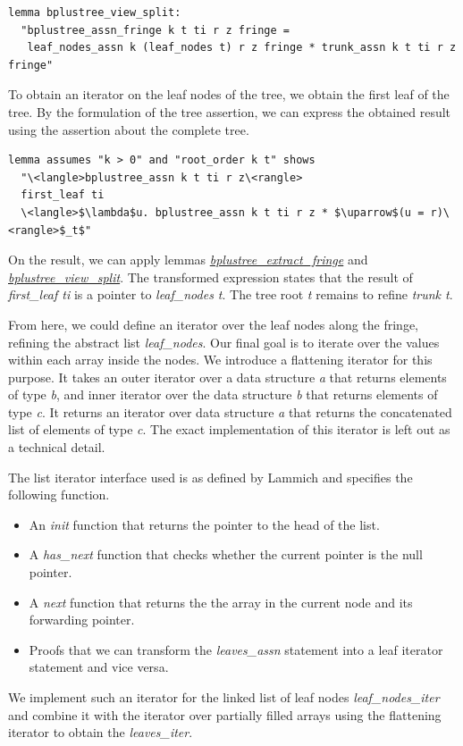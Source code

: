 \documentclass[runningheads]{llncs}
\begin{document}
\begin{lstlisting}[mathescape=true, language=Isabelle,label=lst:btree-view-split]
lemma bplustree_view_split:
  "bplustree_assn_fringe k t ti r z fringe =
   leaf_nodes_assn k (leaf_nodes t) r z fringe * trunk_assn k t ti r z fringe"
\end{lstlisting}

To obtain an iterator on the leaf nodes of the tree,
we obtain the first leaf of the tree.
By the formulation of the tree assertion, we can express
the obtained result using the assertion about the complete tree.

\begin{lstlisting}[mathescape=true, language=Isabelle,label=lst:btree-first-leaf]
lemma assumes "k > 0" and "root_order k t" shows
  "\<langle>bplustree_assn k t ti r z\<rangle>
  first_leaf ti
  \<langle>$\lambda$u. bplustree_assn k t ti r z * $\uparrow$(u = r)\<rangle>$_t$"
\end{lstlisting}

On the result, we can apply lemmas \hyperref[lst:btree-extract-fringe]{\emph{bplustree\_extract\_fringe}} 
and \hyperref[lst:btree-view-split]{\emph{bplustree\_view\_split}}.
The transformed expression states that
the result of \emph{first\_leaf ti} is a pointer to \emph{leaf\_nodes t}.
The tree root \emph{t} remains to refine \emph{trunk t}.

From here, we could define an iterator over the leaf nodes
along the fringe, refining the abstract list \emph{leaf\_nodes}.
Our final goal is to iterate over the values within each array inside the nodes.
We introduce a flattening iterator for this purpose.
It takes an outer iterator over a data structure \textit{a} that returns elements of type \textit{b},
and inner iterator over the data structure \textit{b} that returns elements of type \textit{c}.
It returns an iterator over data structure \textit{a}
that returns the concatenated list of elements of type \textit{c}.
The exact implementation of this iterator is left out as a technical detail.

The list iterator interface used is as defined by Lammich \cite{DBLP:conf/itp/Lammich19}
and specifies the following function.
\begin{itemize}
    \item An \emph{init} function that returns the pointer to the head of the list.
    \item A \emph{has\_next} function that checks whether the current pointer is the null pointer.
    \item A \emph{next} function that returns the the array in the current node and its forwarding pointer.
    \item Proofs that we can transform the \emph{leaves\_assn} statement into 
          a leaf iterator statement and vice versa.
\end{itemize}
We implement such an iterator for the linked list of leaf nodes \emph{leaf\_nodes\_iter}
and combine it with the iterator over partially filled arrays
using the flattening iterator to obtain the \emph{leaves\_iter}.
\end{document}
